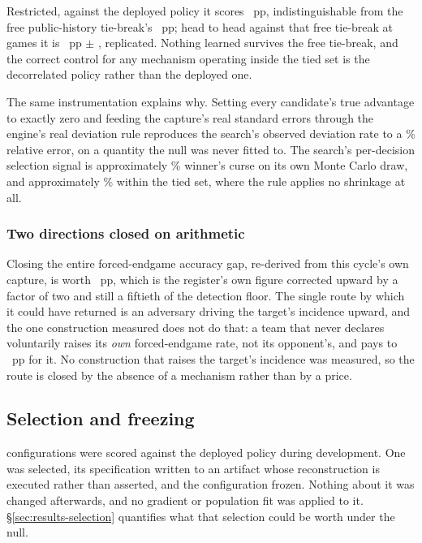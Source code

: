 Restricted, against the deployed policy it scores \vsevenKfiveTieOnly{}~pp, indistinguishable from
the free public-history tie-break's \vsevenKfiveFreeTie{}~pp; head to head against that free tie-break at
\vsevenPhaseThreeCell{} games it is \vsevenKfiveHeadToHead{}~pp $\pm$ \vsevenKfivePm{}, replicated.
Nothing learned survives the free tie-break, and the correct control for any mechanism operating
inside the tied set is the decorrelated policy rather than the deployed one.

The same instrumentation explains why. Setting every candidate's true advantage to exactly zero and
feeding the capture's real standard errors through the engine's real deviation rule reproduces the
search's observed deviation rate to a \vsevenCurseRelErr\% relative error, on a quantity the null was
never fitted to. The search's per-decision selection signal is approximately \vsevenCurseShare\%
winner's curse on its own Monte Carlo draw, and approximately \vsevenCurseTieShare\% within the tied
set, where the rule applies no shrinkage at all.

\subsubsection{Two directions closed on arithmetic}
\label{sec:development-arithmetic}

Closing the entire forced-endgame accuracy gap, re-derived from this cycle's own capture, is worth
\vsevenLthirteenClose{}~pp, which is the register's own figure corrected upward by a factor of two and
still a fiftieth of the detection floor. The single route by which it could have returned is an
adversary driving the target's incidence upward, and the one construction measured does not do that:
a team that never declares voluntarily raises its \emph{own} forced-endgame rate, not its opponent's,
and pays \vsevenLthirteenAdvCostLo{} to \vsevenLthirteenAdvCostHi{}~pp for it. No construction that
raises the target's incidence was measured, so the route is closed by the absence of a mechanism
rather than by a price.

\subsection{Selection and freezing}
\label{sec:development-freeze}

\vsevenSelK{} configurations were scored against the deployed policy during development. One was
selected, its specification written to an artifact whose reconstruction is executed rather than
asserted, and the configuration frozen. Nothing about it was changed afterwards, and no gradient or population fit was applied to it. \S\ref{sec:results-selection} quantifies what that selection could be worth
under the null.
